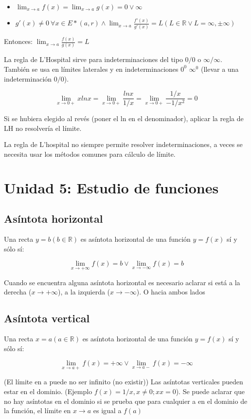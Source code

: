 \documentclass{report}
\begin{document}
			\begin{itemize}
				\item $\lim_{x \to a}f(x)=\lim_{x \to a}g(x)=0 \vee \infty$
				\item $g'(x) \neq 0 \ \forall x \in E*(a,r) \wedge \lim_{x \to a}\frac{f'(x)}{g'(x)}=L (L \in \mathbb{R} \vee L=\infty, \pm \infty)$
			\end{itemize}
		
		Entonces: $\lim_{x \to a}\frac{f(x)}{g(x)}=L$
		
		La regla de L'Hospital sirve para indeterminaciones del tipo $0/0$ o $\infty/\infty$. También se usa en límites laterales y en indeterminaciones $0^0$ $\infty^0$ (llevar a una indeterminación $0/0$). 
		
		$$\lim_{x \to 0+}xlnx=\lim_{x \to 0+}\frac{lnx}{1/x}=\lim_{x \to 0+}\frac{1/x}{-1/x^2}=0$$
		
		Si se hubiera elegido al revés (poner el ln en el denominador), aplicar la regla de LH no resolvería el límite.
		
		La regla de L'hospital no siempre permite resolver indeterminaciones, a veces se necesita usar los métodos comunes para cálculo de límite.
		
\chapter{Unidad 5: Estudio de funciones}
	\section{Asíntota horizontal}
		Una recta $y=b (b\in \mathbb{R})$ es asíntota horizontal de una función $y=f(x)$ sí y sólo sí:
		
		$$\lim_{x \to +\infty}f(x)=b \vee \lim_{x \to -\infty}f(x)=b$$
		
		Cuando se encuentra alguna asíntota horizontal es necesario aclarar si está a la derecha ($x \to +\infty$), a la izquierda ($x \to -\infty$). O hacia ambos lados
		
	\section{Asíntota vertical}
		Una recta $x=a (a\in \mathbb{R})$ es asíntota horizontal de una función $y=f(x)$ sí y sólo sí:
		
		$$\lim_{x \to a+}f(x)=+\infty \vee \lim_{x \to a-}f(x)=-\infty$$
		
		(El límite en a puede no ser infinito (no existir))
		Las asíntotas verticales pueden estar en el dominio. (Ejemplo $f(x)=1/x, x\neq 0 ; x x=0$).
		Se puede aclarar que no hay asíntotas en el dominio si se prueba que para cualquier a en el dominio de la función, el límite en $x \to a$ es igual a $f(a)$
		
\end{document}

